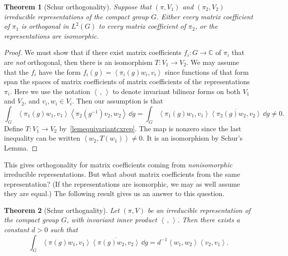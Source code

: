 \documentclass[12pt,reqno]{book}%
\newtheorem{theorem}{Theorem}[chapter]
\theoremstyle{definition}
\theoremstyle{remark}
\theoremstyle{theorem}
\theoremstyle{remark}
\renewcommand{\d}{\dd}
\begin{document}
\begin{theorem}[Schur orthogonality]\label{thmschurortho}%
    Suppose that $(\pi, V_1)$ and $(\pi_2, V_2)$ irreducible representations of the compact group $G$.
    Either every matrix coefficient of $\pi_1$ is orthogonal in $L^2(G)$ to every matrix coefficient of $\pi_2$, or the representations are isomorphic.
\end{theorem}%
\begin{proof}%
    We must show that if there exist matrix coefficients $f_i : G \to \mathbb{C}$ of $\pi_i$ that are \emph{not} orthogonal, then there is an isomorphism $T : V_1 \to V_2$.
    We may assume that the $f_i$ have the form $f_i(g) = {\left\langle \pi_i(g)w_i, v_i\right\rangle}$ since functions of that form span the spaces of matrix coefficients of matrix coefficients of the representations $\pi_i$.
    Here we use the notation ${\left\langle \, , \,\right\rangle}$ to denote invariant bilinear forms on both $V_1$ and $V_2$, and $v_i, w_i \in V_i$.
    Then our assumption is that
    \[
        \int_{G} {\left\langle \pi_1(g)w_1, v_1\right\rangle} {\left\langle \pi_2(g^{-1})v_2, w_2\right\rangle} \, \d g = \int_{G} {\left\langle \pi_1(g)w_1, v_1\right\rangle} \overline{{\left\langle \pi_2(g)w_2, v_2\right\rangle}} \, \d g \neq 0.
    \]
    Define $T : V_1 \to V_2$ by~\eqref{lemequivariantcxrep}.
    The map is nonzero since the last inequality can be written ${\left\langle w_2, T(w_1)\right\rangle} \neq 0$.
    It is an isomorphism by Schur's Lemma.
\end{proof}%

This gives orthogonality for matrix coefficients coming from \emph{nonisomorphic} irreducible representations.
But what about matrix coefficients from the same representation?
(If the representations are isomorphic, we may as well assume they are equal.)
The following result gives us an answer to this question.

\begin{theorem}[Schur orthognality]\label{thmschurorthosamerep}%
    Let $(\pi, V)$ be an irreducible representation of the compact group $G$, with invariant inner product ${\left\langle \, , \, \right\rangle}$.
    Then there exists a constant $d > 0$ such that
    \begin{equation}\label{eqschurorthosamerep}
        \int_{G} {\left\langle \pi(g)w_1, v_1\right\rangle} \overline{{\left\langle \pi(g)w_2, v_2\right\rangle}} \, \d g = d^{-1} {\left\langle w_1, w_2\right\rangle} {\left\langle v_2, v_1\right\rangle}.
    \end{equation}
\end{theorem}%
\end{document}
